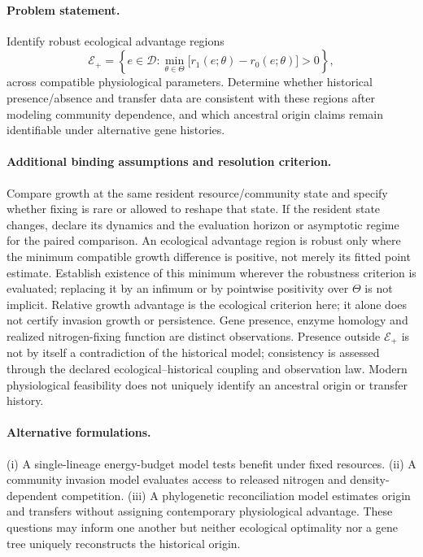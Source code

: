 \documentclass[11pt]{article}
\begin{document}
\paragraph{Problem statement.} Identify robust ecological advantage regions
    \[\mathcal E_+=\left\{e\in\mathcal D:\min_{\theta\in\Theta}\bigl[r_1(e;\theta)-r_0(e;\theta)\bigr]>0\right\},\]
    across compatible physiological parameters. Determine whether historical presence/absence and transfer data are consistent with these regions after modeling community dependence, and which ancestral origin claims remain identifiable under alternative gene histories.

\paragraph{Additional binding assumptions and resolution criterion.} Compare growth at the same resident resource/community state and specify whether fixing is rare or allowed to reshape that state. If the resident state changes, declare its dynamics and the evaluation horizon or asymptotic regime for the paired comparison. An ecological advantage region is robust only where the minimum compatible growth difference is positive, not merely its fitted point estimate. Establish existence of this minimum wherever the robustness criterion is evaluated; replacing it by an infimum or by pointwise positivity over $\Theta$ is not implicit. Relative growth advantage is the ecological criterion here; it alone does not certify invasion growth or persistence. Gene presence, enzyme homology and realized nitrogen-fixing function are distinct observations. Presence outside $\mathcal E_+$ is not by itself a contradiction of the historical model; consistency is assessed through the declared ecological--historical coupling and observation law. Modern physiological feasibility does not uniquely identify an ancestral origin or transfer history.

\paragraph{Alternative formulations.} (i) A single-lineage energy-budget model tests benefit under fixed resources. (ii) A community invasion model evaluates access to released nitrogen and density-dependent competition. (iii) A phylogenetic reconciliation model estimates origin and transfers without assigning contemporary physiological advantage. These questions may inform one another but neither ecological optimality nor a gene tree uniquely reconstructs the historical origin.
\end{document}
